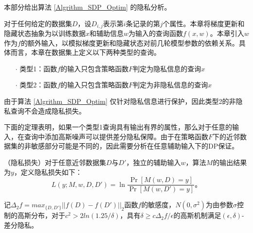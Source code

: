本部分给出算法 \ref{Algrithm_SDP_Optim} 的隐私分析。


对于任何给定的数据集$D$，设$D_{i,j}$表示第$i$条记录的第$j$个属性。本章将梯度更新和隐藏状态抽象为以训练数据$x$和辅助信息$w$为输入的查询函数$f(x, w)$。本章引入$w$作为$f$的额外输入，以模拟梯度更新和隐藏状态对前几轮模型参数的依赖关系。具体而言，本章在数据集上定义以下两种类型的查询。
\begin{itemize}
	\item [$\cdot$]类型1：函数$f$的输入只包含策略函数$F$判定为隐私信息的查询$x$
	\item [$\cdot$]类型2：函数$f$的输入只包含策略函数$F$判定为非隐私信息的查询$x$

\end{itemize}


由于算法 \ref{Algrithm_SDP_Optim} 仅针对隐私信息进行保护，因此类型2的非隐私查询不会造成隐私损失。

下面的定理表明，如果一个类型1查询具有输出有界的属性，那么对于任意的输入，在查询中添加高斯噪声可以提供差分隐私保障。由于在策略函数$F$下的近邻数据集的非敏感部分可能是不同的，因此需要分析在任意辅助输入下的DP保证。

\begin{definition}
	（隐私损失\cite{Algorithmic_Foundations_of_DP}）对于任意近邻数据集$D$与$D'$，独立的辅助输入$w$，算法$M$的输出结果为$y$，定义隐私损失如下：
	\begin{equation}
		L(y;M,w,D,D')=\ln\frac{\Pr[M(w,D)=y]}{\Pr[M(w,D')=y]}\text{。}
	\end{equation}
\end{definition}

\begin{theorem} \label{guassian_mechanism}
	记$\Delta_2f=max_{\{D,D'\}}||f(D)-f(D')||_2$函数$f$的敏感度，$N(0,\sigma^2)$为由参数$\sigma$控制的高斯分布，对于$c^2>2ln(1.25/\delta)$，具有$\delta\geq c\Delta_2f/\epsilon$的高斯机制满足$(\epsilon,\delta)$-差分隐私。
\end{theorem}

